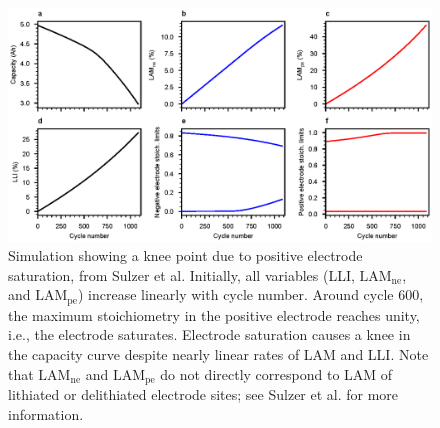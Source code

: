 \documentclass[journal=jpclcd,manuscript=article]{achemso}
\begin{document}
\begin{figure}[p]
    \centering
    \includegraphics[width=\linewidth]{figures/stoich_knee.eps}
    \caption{Simulation showing a knee point due to positive electrode saturation, from Sulzer et al.\cite{sulzer_accelerated_2021} Initially, all variables (LLI, $\mathrm{LAM_{ne}}$, and $\mathrm{LAM_{pe}}$) increase linearly with cycle number. Around cycle 600, the maximum stoichiometry in the positive electrode reaches unity, i.e., the electrode saturates. Electrode saturation causes a knee in the capacity curve despite nearly linear rates of LAM and LLI.
    Note that $\mathrm{LAM_{ne}}$ and $\mathrm{LAM_{pe}}$ do not directly correspond to LAM of lithiated or delithiated electrode sites; see Sulzer et al.\cite{sulzer_accelerated_2021} for more information.}
    \label{fig:electrode_sat_simulation}
\end{figure}

\end{document}
